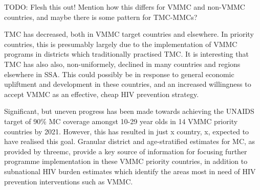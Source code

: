 \documentclass{article}
\begin{document}
TODO: Flesh this out! Mention how this differs for VMMC and non-VMMC countries, and maybe there is some pattern for TMC-MMCs?

TMC has decreased, both in VMMC target countries and elsewhere. 
In priority countries, this is presumably largely due to the implementation of VMMC programs in districts which traditionally practised TMC. 
It is interesting that TMC has also also, non-uniformely, declined in many countries and regions elsewhere in SSA. 
This could possibly be in response to general economic upliftment and development in these countries, and an increased willingness to accept VMMC as an effective, cheap HIV prevention strategy. 

Significant, but uneven progress has been made towards achieving the UNAIDS target of 90\% 
MC coverage amongst 10-29 year olds in 14 VMMC priority countries by 2021.  
However, this has resulted in just x country, x, expected to have realised this goal.
Granular district and age-stratified estimates for MC, as provided by threemc, provide a key source of information for focusing further programme implementation in these VMMC priority countries, in addition to subnational HIV burden estimates which identify the areas most in need of HIV prevention interventions such as VMMC. 

\end{document}
